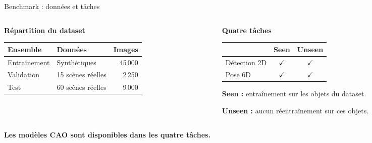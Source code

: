 \documentclass[aspectratio=169,11pt]{beamer}
\newcommand{\framesource}{}
\newcommand{\src}[1]{\gdef\framesource{#1}}
\newcommand{\key}[1]{{\color{teal}\bfseries #1}}
\newcommand{\smalltxt}{\fontsize{19}{24}\selectfont}
\begin{document}
\begin{frame}{Benchmark : données et tâches}
\src{Huang et al., §4.1--4.2. Les scènes de validation et de test sont distinctes.}
\begin{columns}[T,onlytextwidth]
\begin{column}{.49\textwidth}
\key{Répartition du dataset}
\par\vspace{4mm}
{\smalltxt
\renewcommand{\arraystretch}{1.65}
\begin{tabularx}{\linewidth}{@{}lXr@{}}
\toprule
\textbf{Ensemble} & \textbf{Données} & \textbf{Images}\\
\midrule
Entraînement & Synthétiques & 45\,000\\
Validation & 15 scènes réelles & 2\,250\\
Test & 60 scènes réelles & 9\,000\\
\bottomrule
\end{tabularx}}
\end{column}
\begin{column}{.45\textwidth}
\key{Quatre tâches}
\par\vspace{4mm}
{\smalltxt
\renewcommand{\arraystretch}{1.65}
\begin{tabularx}{\linewidth}{@{}Xcc@{}}
\toprule
 & \textbf{Seen} & \textbf{Unseen}\\
\midrule
Détection 2D & $\checkmark$ & $\checkmark$\\
Pose 6D & $\checkmark$ & $\checkmark$\\
\bottomrule
\end{tabularx}
\par\vspace{4mm}
\textbf{Seen :} entraînement sur les objets du dataset.
\par\textbf{Unseen :} aucun réentraînement sur ces objets.}
\end{column}
\end{columns}
\par\vspace{8mm}
\textbf{Les modèles CAO sont disponibles dans les quatre tâches.}
\end{frame}
\end{document}
